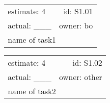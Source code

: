 \documentclass[letterpaper,12pt]{article}
\begin{document}
\pagestyle{empty}
\twocolumn


\vspace{0.4in}
\filbreak
\begin{tabular}{l r}
  estimate: 4    & id: S1.01 \\
  actual: \_\_\_ & owner: bo \\
  \hline
  \multicolumn{2}{p{\columnwidth}}{name of task1} \\
\end{tabular}

\vspace{0.4in}
\filbreak
\begin{tabular}{l r}
  estimate: 4    & id: S1.02 \\
  actual: \_\_\_ & owner: other \\
  \hline
  \multicolumn{2}{p{\columnwidth}}{name of task2} \\
\end{tabular}
\end{document}

